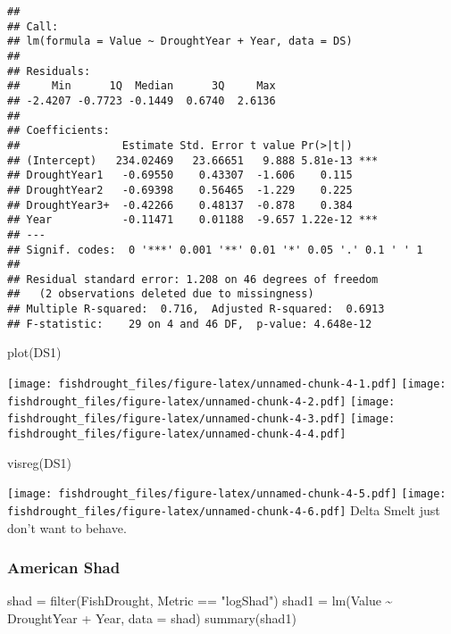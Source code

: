 \documentclass[
]{article}
\newenvironment{Shaded}{\begin{snugshade}}{\end{snugshade}}
\newcommand{\AttributeTok}[1]{\textcolor[rgb]{0.77,0.63,0.00}{#1}}
\newcommand{\FunctionTok}[1]{\textcolor[rgb]{0.00,0.00,0.00}{#1}}
\newcommand{\NormalTok}[1]{#1}
\newcommand{\OtherTok}[1]{\textcolor[rgb]{0.56,0.35,0.01}{#1}}
\newcommand{\SpecialCharTok}[1]{\textcolor[rgb]{0.00,0.00,0.00}{#1}}
\newcommand{\StringTok}[1]{\textcolor[rgb]{0.31,0.60,0.02}{#1}}
\begin{document}
\begin{verbatim}
## 
## Call:
## lm(formula = Value ~ DroughtYear + Year, data = DS)
## 
## Residuals:
##     Min      1Q  Median      3Q     Max 
## -2.4207 -0.7723 -0.1449  0.6740  2.6136 
## 
## Coefficients:
##                Estimate Std. Error t value Pr(>|t|)    
## (Intercept)   234.02469   23.66651   9.888 5.81e-13 ***
## DroughtYear1   -0.69550    0.43307  -1.606    0.115    
## DroughtYear2   -0.69398    0.56465  -1.229    0.225    
## DroughtYear3+  -0.42266    0.48137  -0.878    0.384    
## Year           -0.11471    0.01188  -9.657 1.22e-12 ***
## ---
## Signif. codes:  0 '***' 0.001 '**' 0.01 '*' 0.05 '.' 0.1 ' ' 1
## 
## Residual standard error: 1.208 on 46 degrees of freedom
##   (2 observations deleted due to missingness)
## Multiple R-squared:  0.716,  Adjusted R-squared:  0.6913 
## F-statistic:    29 on 4 and 46 DF,  p-value: 4.648e-12
\end{verbatim}

\begin{Shaded}
\begin{Highlighting}[]
\FunctionTok{plot}\NormalTok{(DS1)}
\end{Highlighting}
\end{Shaded}

\texttt{[image: fishdrought\_files/figure-latex/unnamed-chunk-4-1.pdf]}
\texttt{[image: fishdrought\_files/figure-latex/unnamed-chunk-4-2.pdf]}
\texttt{[image: fishdrought\_files/figure-latex/unnamed-chunk-4-3.pdf]}
\texttt{[image: fishdrought\_files/figure-latex/unnamed-chunk-4-4.pdf]}

\begin{Shaded}
\begin{Highlighting}[]
\FunctionTok{visreg}\NormalTok{(DS1)}
\end{Highlighting}
\end{Shaded}

\texttt{[image: fishdrought\_files/figure-latex/unnamed-chunk-4-5.pdf]}
\texttt{[image: fishdrought\_files/figure-latex/unnamed-chunk-4-6.pdf]}
Delta Smelt just don't want to behave.

\hypertarget{american-shad}{%
\subsubsection{American Shad}\label{american-shad}}

\begin{Shaded}
\begin{Highlighting}[]
\NormalTok{shad }\OtherTok{=} \FunctionTok{filter}\NormalTok{(FishDrought, Metric }\SpecialCharTok{==} \StringTok{"logShad"}\NormalTok{)}
\NormalTok{shad1 }\OtherTok{=} \FunctionTok{lm}\NormalTok{(Value }\SpecialCharTok{\textasciitilde{}}\NormalTok{ DroughtYear }\SpecialCharTok{+}\NormalTok{ Year, }\AttributeTok{data =}\NormalTok{ shad)}
\FunctionTok{summary}\NormalTok{(shad1)}
\end{Highlighting}
\end{Shaded}
\end{document}
